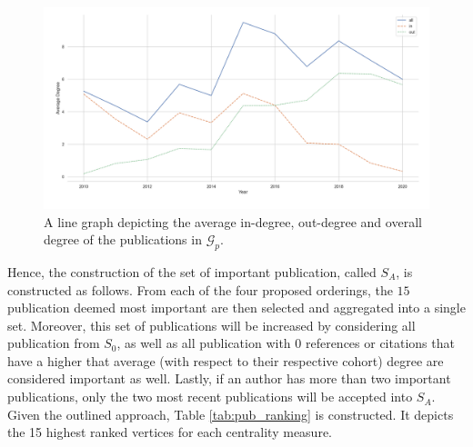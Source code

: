 \documentclass[11pt,a4paper]{book}
\theoremstyle{definition}
\theoremstyle{definition}
\theoremstyle{definition}
\theoremstyle{remark}
\newcommand{\psetz}{S_{\mathit{0}}}
\newcommand{\prset}{S_{A}}
\newcommand{\pgraph}{\mathcal{G}_{p}}
\begin{document}
\begin{figure}[h]
\includegraphics[width=\textwidth]{average_degree_year.png}
\caption{A line graph depicting the average in-degree, out-degree and overall degree of the publications in $\pgraph$.}
\label{fig:pgraph-avgr_degree_year}
\end{figure}

Hence, the construction of the set of important publication, called $\prset$, is constructed as follows. From each of the four proposed orderings, the $15$  publication deemed most important are then selected and aggregated into a single set.  Moreover, this set of publications will be increased by considering all publication from $\psetz$, as well as all publication with $0$ references or citations that have a higher that average (with respect to their respective cohort) degree are considered important as well. Lastly, if an author has more than two important publications, only the two most recent publications will be accepted into $\prset$.
Given the outlined approach, Table \ref{tab:pub_ranking} is constructed. It depicts the 15 highest ranked vertices for each centrality measure.
\end{document}
